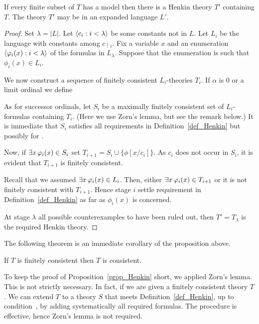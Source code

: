 \begin{proposition}\label{prop_Henkin}If every finite subset of $T$ has a model then there is a Henkin theory $T'$ containing $T$. The theory $T'$ may be in an expanded language $L'$.
\end{proposition}

\begin{proof} Set $\lambda=|L|$.
Let $\langle c_i:i<\lambda\rangle$ be some constants not in $L$.
Let $L_i$ be the language with constants among $c_{\restriction i}$.
Fix a variable $x$ and an enumeration $\langle\varphi_i(x):i<\lambda\rangle$ of the formulas in $L_\lambda$.
Suppose that the enumeration is such that $\phi_i(x)\in L_i$.

We now construct a sequence of finitely consistent $L_i$-theories $T_i$. 
If $\alpha$ is $0$ or a limit ordinal we define 


As for successor ordinals, let $S_i$ be a maximally finitely consistent set of $L_i$-formulas containing $T_i$. (Here we use Zorn's lemma, but see the remark below.) It is immediate that $S_i$ satisfies all requirements in Definition~\ref{def_Henkin} but possibly for .

Now, if $\exists x\,\varphi_i(x)\in S_i$ set $T_{i+1}=S_i\cup\big\{\phi[x/c_i]\big\}$. As $c_i$ does not occur in $S_i$, it is evident that $T_{i+1}$ is finitely consistent. 

Recall that we assumed $\exists x\,\varphi_i(x)\in L_i$. Then, either $\exists x\,\varphi_i(x)\in T_{i+1}$ or it is not finitely consistent with $T_{i+1}$. Hence stage $i$ settle requirement  in Definition~\ref{def_Henkin} as far as  $\phi_i(x)$ is concerned.

At stage $\lambda$ all possible counterexamples to  have been ruled out, then $T'=T_\lambda$ is the required Henkin theory.
\end{proof}

The following theorem is an immediate corollary of the proposition above.

\begin{void}
If $T$ is finitely consistent then $T$ is consistent.
\end{void}

To keep the proof of Proposition~\ref{prop_Henkin} short, we applied Zorn's lemma. 
This is not strictly necessary. 
In fact, if we are given a finitely consistent theory $T$. 
We can extend $T$ to a theory $S$ that meets Definition~\ref{def_Henkin}, up to condition~, by adding systematically all required formulas. The procedure is effective, hence Zorn's lemma is not required. 

